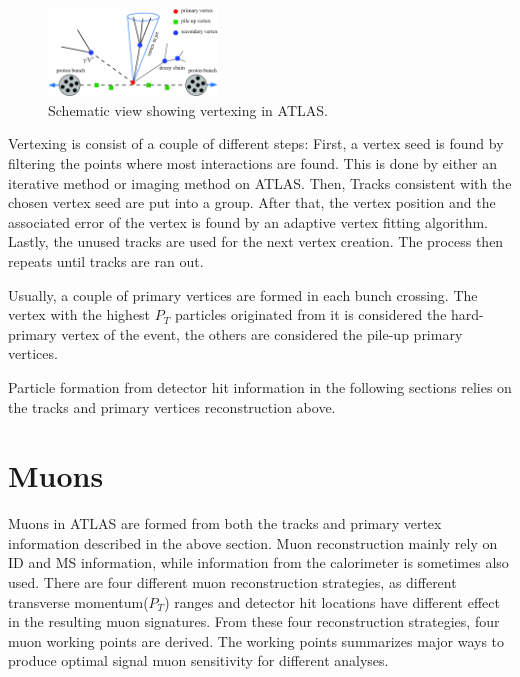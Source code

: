 \begin{figure}[!htb]
    \begin{center}
        \includegraphics[width=0.4\textwidth]{figures/common_ana/Vertex}
        \caption{        
            Schematic view showing vertexing in ATLAS\cite{4774734}.
        }
    \end{center}
\end{figure}

Vertexing is consist of a couple of different steps: First, a vertex seed is found by filtering the points where most interactions are found. This is done by either an iterative method or imaging method on ATLAS. Then, Tracks consistent with the chosen vertex seed are put into a group. After that, the vertex position and the associated error of the vertex is found by an adaptive vertex fitting algorithm. Lastly, the unused tracks are used for the next vertex creation. The process then repeats until tracks are ran out. 

Usually, a couple of primary vertices are formed in each bunch crossing. The vertex with the highest $P_{T}$ particles originated from it is considered the hard-primary vertex of the event, the others are considered the pile-up primary vertices. 

Particle formation from detector hit information in the following sections relies on the tracks and primary vertices reconstruction above.

\section{Muons}
\label{sec:Muon}
Muons in ATLAS are formed from both the tracks and primary vertex information described in the above section. Muon reconstruction mainly rely on ID and MS information, while information from the calorimeter is sometimes also used. There are four different muon reconstruction strategies, as different transverse momentum($P_{T}$) ranges and detector hit locations have different effect in the resulting muon signatures. From these four reconstruction strategies, four muon working points are derived.
The working points summarizes major ways to produce optimal signal muon sensitivity for different analyses. 


